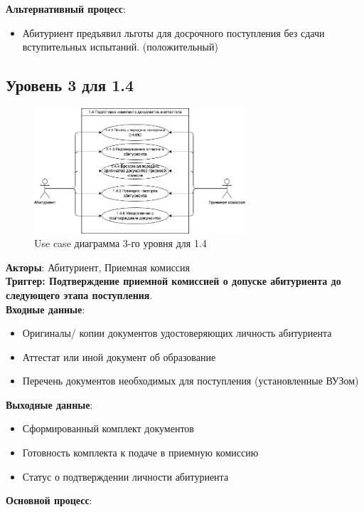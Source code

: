 \documentclass[areasetadvanced]{scrartcl}
\begin{document}
\textbf{Альтернативный процесс}:
\begin{itemize}
    \item Абитуриент предъявил льготы для досрочного поступления без сдачи вступительных испытаний. (положительный)
\end{itemize}
\newpage
\subsection{Уровень 3 для 1.4}
\begin{figure}[H]
    \centering
    \includegraphics[width=0.7\textwidth]{images/UseCase_3_14.png}
    \caption{Use case диаграмма 3-го уровня для 1.4}
    \label{fig:syntdiag}
\end{figure} 
\textbf{Акторы}: Абитуриент, Приемная комиссия\\
\textbf{Триггер: Подтверждение приемной комиссией о допуске абитуриента до следующего этапа поступления}.\\
\textbf{Входные данные}:
\begin{itemize}
    \item Оригиналы/ копии документов удостоверяющих личность абитуриента
    \item Аттестат или иной документ об образование
    \item Перечень документов необходимых для поступления (установленные ВУЗом)
\end{itemize}
\textbf{Выходные данные}:
\begin{itemize}
    \item Сформированный комплект документов
    \item Готовность комплекта к подаче в приемную комиссию
    \item Статус о подтверждении личности абитуриента
\end{itemize}
\textbf{Основной процесс}:
\end{document}
